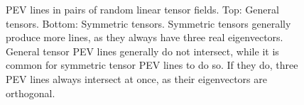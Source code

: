 \begin{figure}[t]
    \caption{\ac{PEV} lines in pairs of random linear tensor fields. Top: General
             tensors. Bottom: Symmetric tensors. Symmetric tensors generally
             produce more lines, as they always have three real eigenvectors.
             General tensor \ac{PEV} lines generally do not intersect, while it is
             common for symmetric tensor \ac{PEV} lines to do so. If they do,
             three \ac{PEV} lines always intersect at once, as their eigenvectors
             are orthogonal.}
    \label{fig:rand_lines}
\end{figure}
%
%
